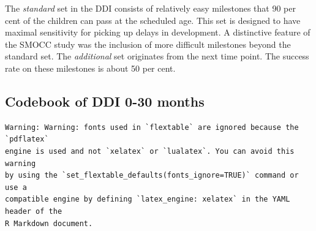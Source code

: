 \documentclass[
]{book}
\begin{document}
The \emph{standard} set in the DDI consists of relatively easy milestones that 90 per cent of the children can pass at the scheduled age. This set is designed to have maximal sensitivity for picking up delays in development. A distinctive feature of the SMOCC study was the inclusion of more difficult milestones beyond the standard set. The \emph{additional} set originates from the next time point. The success rate on these milestones is about 50 per cent.

\hypertarget{codebook-of-ddi-0-30-months}{%
\subsection{Codebook of DDI 0-30 months}\label{codebook-of-ddi-0-30-months}}

\begin{verbatim}
Warning: Warning: fonts used in `flextable` are ignored because the `pdflatex`
engine is used and not `xelatex` or `lualatex`. You can avoid this warning
by using the `set_flextable_defaults(fonts_ignore=TRUE)` command or use a
compatible engine by defining `latex_engine: xelatex` in the YAML header of the
R Markdown document.
\end{verbatim}

\providecommand{\docline}[3]{\noalign{\global\setlength{\arrayrulewidth}{#1}}\arrayrulecolor[HTML]{#2}\cline{#3}}

\setlength{\tabcolsep}{2pt}

\renewcommand*{\arraystretch}{1.5}
\end{document}
